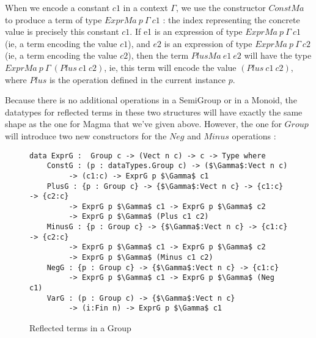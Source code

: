 When we encode a constant $c1$ in a context $\Gamma$, we use the constructor $ConstMa$ to produce a term of type $ExprMa\ p\ \Gamma\ c1$ : the index representing the concrete value is precisely this constant $c1$.
If e1 is an expression of type $ExprMa\ p\ \Gamma\ c1$ (ie, a term encoding the value $c1$), and $e2$ is an expression of type $ExprMa\ p\ \Gamma\ c2$ (ie, a term encoding the value $c2$), then the term $PlusMa\ e1\ e2$ will have the type $ExprMa\ p\ \Gamma\ (Plus\ c1\ c2)$, ie, this term will encode the value $(Plus\ c1\ c2)$, where $Plus$ is the operation defined in the current instance $p$.


%
%
Because there is no additional operations in a SemiGroup or in a Monoid, the datatypes for reflected terms in these two structures will have exactly the same shape as the one for Magma that we've given above.
However, the one for $Group$ will introduce two new constructors for the $Neg$ and $Minus$ operations :


\begin{figure}[H]
\figrule
\begin{center}
\begin{lstlisting}
data ExprG :  Group c -> (Vect n c) -> c -> Type where
    ConstG : (p : dataTypes.Group c) -> ($\Gamma$:Vect n c) 
         -> (c1:c) -> ExprG p $\Gamma$ c1
    PlusG : {p : Group c} -> {$\Gamma$:Vect n c} -> {c1:c} -> {c2:c} 
         -> ExprG p $\Gamma$ c1 -> ExprG p $\Gamma$ c2 
         -> ExprG p $\Gamma$ (Plus c1 c2)
    MinusG : {p : Group c} -> {$\Gamma$:Vect n c} -> {c1:c} -> {c2:c} 
         -> ExprG p $\Gamma$ c1 -> ExprG p $\Gamma$ c2 
         -> ExprG p $\Gamma$ (Minus c1 c2)
    NegG : {p : Group c} -> {$\Gamma$:Vect n c} -> {c1:c} 
         -> ExprG p $\Gamma$ c1 -> ExprG p $\Gamma$ (Neg c1)
    VarG : (p : Group c) -> {$\Gamma$:Vect n c} 
         -> (i:Fin n) -> ExprG p $\Gamma$ c1
\end{lstlisting}
\end{center}
\caption{Reflected terms in a Group}
\figrule
\end{figure}

